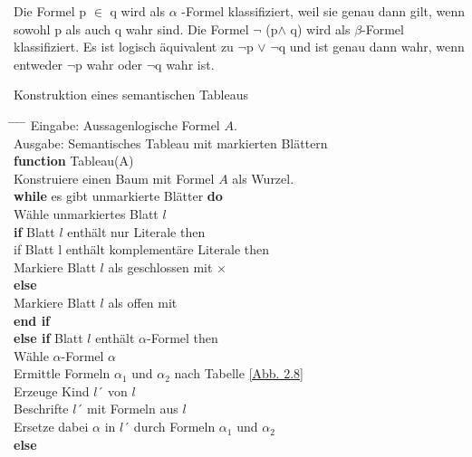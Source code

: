 \begin{ex} \label{Beispiel 2.63} \end{ex} Die Formel p $\in$ q wird als $\alpha$ -Formel klassifiziert, weil sie genau dann gilt, wenn sowohl p als auch q wahr sind. Die Formel $\neg$ (p$\wedge$ q) wird als $\beta$-Formel klassifiziert.
Es ist logisch äquivalent zu $\neg$p $\vee$ $\neg$q und ist genau dann wahr, wenn entweder $\neg$p wahr oder $\neg$q wahr ist.

\begin{al}Konstruktion eines semantischen Tableaus \label{Algorithmus 2.64} \end{al} 
\begin{tabbing}  
\hspace{0.3in} \= \hspace{0.3in} \=  \hspace{0.3in} \= \hspace{0.3in} \= \kill
Eingabe: Aussagenlogische Formel $A$.\\
Ausgabe: Semantisches Tableau mit markierten Blättern\\
\textbf{function} Tableau(A)\\
\> Konstruiere einen Baum mit Formel $A$ als Wurzel.\\
\> \textbf{while} es gibt unmarkierte Blätter \textbf{do} \\
\> Wähle unmarkiertes Blatt $l$\\
\> \>\textbf{if}  Blatt $l$ enthält nur Literale then\\
\> \> \> if Blatt l enthält komplementäre Literale then\\
\> \> \> \> Markiere Blatt $l$ als geschlossen mit $\times$ \\
\> \> \> \textbf{else} \\
\> \> \> \> Markiere Blatt $l$ als offen mit\\
\> \> \> \textbf{end if} \\
\> \> \textbf{else if}  Blatt $l$ enthält $\alpha$-Formel then\\
\> \> \> Wähle $\alpha$-Formel $\alpha$\\
\>\>\> Ermittle Formeln $\alpha_1$ und $\alpha_2$ nach Tabelle \ref{Abb. 2.8}\\
\>\>\> Erzeuge Kind $l´$ von $l$\\
\>\>\> Beschrifte $l´$ mit Formeln aus $l$\\
\>\>\> Ersetze dabei $\alpha$ in $l´$ durch Formeln $\alpha_1$  und $\alpha_2$\\
\>\> \textbf{else} \\

\end{tabbing}
